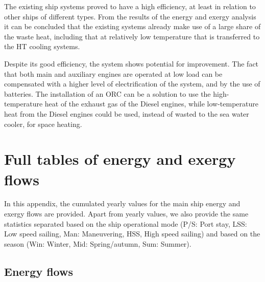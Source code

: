 \documentclass[preprint,12pt]{elsarticle}
\begin{document}
The existing ship systems proved to have a high efficiency, at least in relation to other ships of different types. From the results of the energy and exergy analysis it can be concluded that the existing systems already make use of a large share of the waste heat, including that at relatively low temperature that is transferred to the HT cooling systems. 

Despite its good efficiency, the system shows potential for improvement. The fact that both main and auxiliary engines are operated at low load can be compensated with a higher level of electrification of the system, and by the use of batteries. The installation of an ORC can be a solution to use the high-temperature heat of the exhaust gas of the Diesel engines, while low-temperature heat from the Diesel engines could be used, instead of wasted to the sea water cooler, for space heating. 




  

















\appendix






\section{Full tables of energy and exergy flows} \label{sec:app:flows}

In this appendix, the cumulated yearly values for the main ship energy and exergy flows are provided. Apart from yearly values, we also provide the same statistics separated based on the ship operational mode (P/S: Port stay, LSS: Low speed sailing, Man: Maneuvering, HSS, High speed sailing) and based on the season (Win: Winter, Mid: Spring/autumn, Sum: Summer).

\subsection{Energy flows} \label{sec:app:flo:energy}
\end{document}
